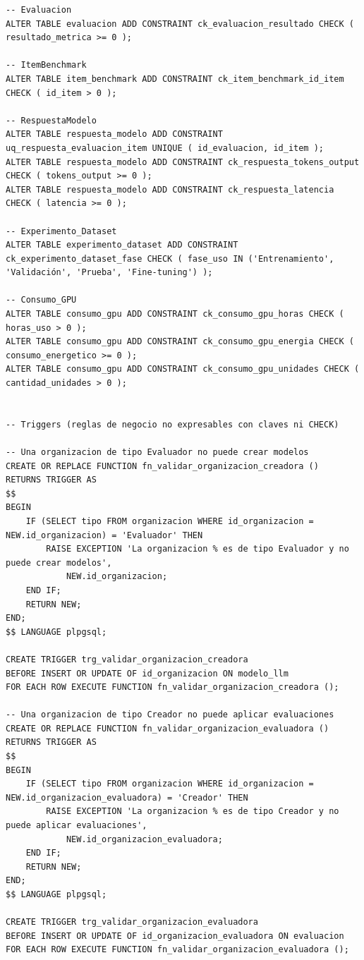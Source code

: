 \documentclass[12pt,a4paper]{article}
\begin{document}
\begin{lstlisting}
-- Evaluacion
ALTER TABLE evaluacion ADD CONSTRAINT ck_evaluacion_resultado CHECK ( resultado_metrica >= 0 );

-- ItemBenchmark
ALTER TABLE item_benchmark ADD CONSTRAINT ck_item_benchmark_id_item CHECK ( id_item > 0 );

-- RespuestaModelo
ALTER TABLE respuesta_modelo ADD CONSTRAINT uq_respuesta_evaluacion_item UNIQUE ( id_evaluacion, id_item );
ALTER TABLE respuesta_modelo ADD CONSTRAINT ck_respuesta_tokens_output CHECK ( tokens_output >= 0 );
ALTER TABLE respuesta_modelo ADD CONSTRAINT ck_respuesta_latencia CHECK ( latencia >= 0 );

-- Experimento_Dataset
ALTER TABLE experimento_dataset ADD CONSTRAINT ck_experimento_dataset_fase CHECK ( fase_uso IN ('Entrenamiento', 'Validación', 'Prueba', 'Fine-tuning') );

-- Consumo_GPU
ALTER TABLE consumo_gpu ADD CONSTRAINT ck_consumo_gpu_horas CHECK ( horas_uso > 0 );
ALTER TABLE consumo_gpu ADD CONSTRAINT ck_consumo_gpu_energia CHECK ( consumo_energetico >= 0 );
ALTER TABLE consumo_gpu ADD CONSTRAINT ck_consumo_gpu_unidades CHECK ( cantidad_unidades > 0 );


-- Triggers (reglas de negocio no expresables con claves ni CHECK)

-- Una organizacion de tipo Evaluador no puede crear modelos
CREATE OR REPLACE FUNCTION fn_validar_organizacion_creadora ()
RETURNS TRIGGER AS
$$
BEGIN
    IF (SELECT tipo FROM organizacion WHERE id_organizacion = NEW.id_organizacion) = 'Evaluador' THEN
        RAISE EXCEPTION 'La organizacion % es de tipo Evaluador y no puede crear modelos',
            NEW.id_organizacion;
    END IF;
    RETURN NEW;
END;
$$ LANGUAGE plpgsql;

CREATE TRIGGER trg_validar_organizacion_creadora
BEFORE INSERT OR UPDATE OF id_organizacion ON modelo_llm
FOR EACH ROW EXECUTE FUNCTION fn_validar_organizacion_creadora ();

-- Una organizacion de tipo Creador no puede aplicar evaluaciones
CREATE OR REPLACE FUNCTION fn_validar_organizacion_evaluadora ()
RETURNS TRIGGER AS
$$
BEGIN
    IF (SELECT tipo FROM organizacion WHERE id_organizacion = NEW.id_organizacion_evaluadora) = 'Creador' THEN
        RAISE EXCEPTION 'La organizacion % es de tipo Creador y no puede aplicar evaluaciones',
            NEW.id_organizacion_evaluadora;
    END IF;
    RETURN NEW;
END;
$$ LANGUAGE plpgsql;

CREATE TRIGGER trg_validar_organizacion_evaluadora
BEFORE INSERT OR UPDATE OF id_organizacion_evaluadora ON evaluacion
FOR EACH ROW EXECUTE FUNCTION fn_validar_organizacion_evaluadora ();


\end{lstlisting}
\end{document}
